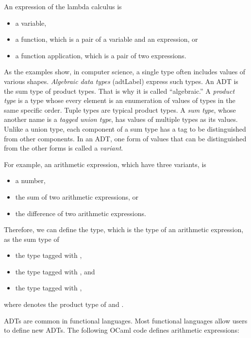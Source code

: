 An expression of the lambda calculus is

\begin{itemize}
\item a variable,
\item a function, which is a pair of a variable and an expression, or
\item a function application, which is a pair of two expressions.
\end{itemize}

As the examples show, in computer science, a single type often includes values of
various shapes. \textit{Algebraic data types}
(\acrshort{adtLabel}) express such types. An ADT
is the sum type of product types. That is why it is called ``algebraic.''
A \textit{product type}
is a type whose every element is an enumeration of values of types in the
same specific order. Tuple types are typical product types. A \textit{sum
type}, whose
another name is a \textit{tagged union type},
has values of multiple types as its values. Unlike a union type,
each component of a sum type has a
tag to be distinguished from other components.
In an ADT, one form of values that can be distinguished from the other forms is
called a \textit{variant}.

For example, an arithmetic expression, which have three variants, is

\begin{itemize}
\item a number,
\item the sum of two arithmetic expressions, or
\item the difference of two arithmetic expressions.
\end{itemize}

Therefore, we can define the  type, which is the type of an arithmetic
expression, as the sum type of

\begin{itemize}
\item the  type tagged with ,
\item the  type tagged with , and
\item the  type tagged with ,
\end{itemize}

where  denotes the product type of  and .

ADTs are common in functional languages. Most functional
languages allow users to define new ADTs. The following OCaml
code defines arithmetic expressions:

